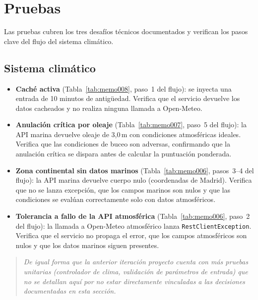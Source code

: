 \section{Pruebas}

Las pruebas cubren los tres desafíos técnicos documentados y verifican los pasos clave del flujo del sistema climático.

\subsection*{Sistema climático}

\begin{itemize}
    \item \textbf{Caché activa} (Tabla~\ref{tab:memo008}, paso~1 del flujo): se inyecta una entrada de 10 minutos de antigüedad. Verifica que el servicio devuelve los datos cacheados y no realiza ninguna llamada a Open-Meteo.

    \item \textbf{Anulación crítica por oleaje} (Tabla~\ref{tab:memo007}, paso~5 del flujo): la API marina devuelve oleaje de 3{,}0\,m con condiciones atmosféricas ideales. Verifica que las condiciones de buceo son adversas, confirmando que la anulación crítica se dispara antes de calcular la puntuación ponderada.

    \item \textbf{Zona continental sin datos marinos} (Tabla~\ref{tab:memo006}, pasos~3--4 del flujo): la API marina devuelve cuerpo nulo (coordenadas de Madrid). Verifica que no se lanza excepción, que los campos marinos son nulos y que las condiciones se evalúan correctamente solo con datos atmosféricos.

    \item \textbf{Tolerancia a fallo de la API atmosférica} (Tabla~\ref{tab:memo006}, paso~2 del flujo): la llamada a Open-Meteo atmosférico lanza \texttt{RestClientException}. Verifica que el servicio no propaga el error, que los campos atmosféricos son nulos y que los datos marinos siguen presentes.
\end{itemize}

\begin{quote}
\small\textit{De igual forma que la anterior iteración proyecto cuenta con más pruebas unitarias (controlador de clima, validación de parámetros de entrada) que no se detallan aquí por no estar directamente vinculadas a las decisiones documentadas en esta sección.}
\end{quote}

